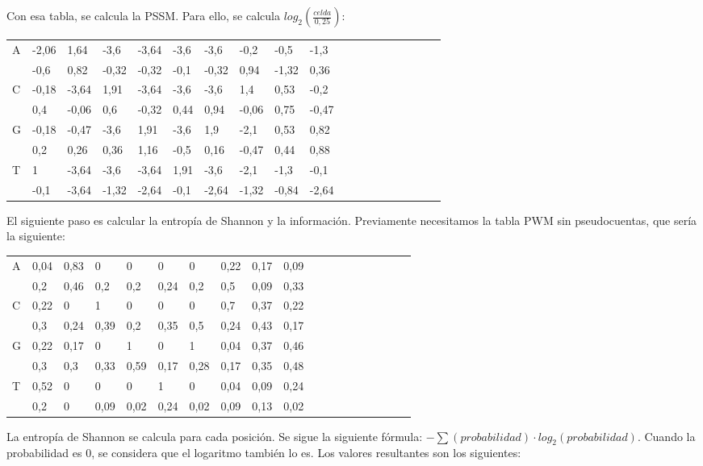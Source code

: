 Con esa tabla, se calcula la PSSM. Para ello, se calcula $log_2(\frac{celda}{0,25})$:
\begin{table}[htbp]
\begin{tabular}{l | llllllllllllllllll}
A & -2,06 & 1,64  & -3,6 & -3,64 & -3,6 & -3,6 & -0,2 & -0,5 & -1,3 \\
& -0,6 & 0,82  & -0,32 & -0,32 & -0,1 & -0,32 & 0,94  & -1,32 & 0,36  \\
C & -0,18 & -3,64 & 1,91 & -3,64 & -3,6 & -3,6 & 1,4  & 0,53 & -0,2 \\
& 0,4  & -0,06 & 0,6   & -0,32 & 0,44 & 0,94  & -0,06 & 0,75  & -0,47 \\
G & -0,18 & -0,47 & -3,6 & 1,91  & -3,6 & 1,9  & -2,1 & 0,53 & 0,82 \\
& 0,2  & 0,26  & 0,36  & 1,16  & -0,5 & 0,16  & -0,47 & 0,44  & 0,88  \\
T & 1  & -3,64 & -3,6 & -3,64 & 1,91 & -3,6 & -2,1 & -1,3 & -0,1 \\
& -0,1 & -3,64 & -1,32 & -2,64 & -0,1 & -2,64 & -1,32 & -0,84 & -2,64
\end{tabular}
\end{table}

El siguiente paso es calcular la entropía de Shannon y la información. Previamente necesitamos la tabla PWM sin pseudocuentas, que sería la siguiente:
\newpage
\begin{table}[h]
\begin{tabular}{l | llllllllllllllllll}
A & 0,04 & 0,83 & 0 & 0 & 0 & 0 & 0,22 & 0,17 & 0,09 \\
& 0,2 & 0,46 & 0,2  & 0,2  & 0,24 & 0,2  & 0,5  & 0,09 & 0,33 \\
C & 0,22  & 0    & 1 & 0 & 0 & 0 & 0,7  & 0,37 & 0,22 \\
& 0,3 & 0,24 & 0,39 & 0,2  & 0,35 & 0,5  & 0,24 & 0,43 & 0,17 \\
G & 0,22  & 0,17 & 0 & 1 & 0 & 1 & 0,04 & 0,37 & 0,46 \\
& 0,3 & 0,3  & 0,33 & 0,59 & 0,17 & 0,28 & 0,17 & 0,35 & 0,48 \\
T & 0,52 & 0    & 0 & 0 & 1 & 0 & 0,04 & 0,09 & 0,24 \\
& 0,2 & 0    & 0,09 & 0,02 & 0,24 & 0,02 & 0,09 & 0,13 & 0,02
\end{tabular}
\end{table}

La entropía de Shannon se calcula para cada posición. Se sigue la siguiente fórmula: $- \sum (probabilidad) \cdot log_2 (probabilidad) $. Cuando la probabilidad es 0, se considera que el logaritmo también lo es. Los valores resultantes son los siguientes:


